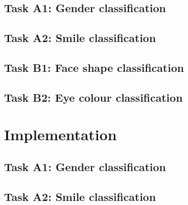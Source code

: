 \documentclass[a4paper,11pt]{article}
\begin{document}
\subsection{Task A1: Gender classification}
\subsection{Task A2: Smile classification}
\subsection{Task B1: Face shape classification}
\subsection{Task B2: Eye colour classification}
\section{Implementation}

\subsection{Task A1: Gender classification}
\subsection{Task A2: Smile classification}
\end{document}

